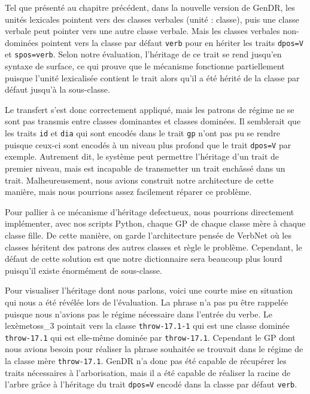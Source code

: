 Tel que présenté au chapitre précédent, dans la nouvelle version de GenDR, les unités lexicales pointent vers des classes verbales (unité : classe), puis une classe verbale peut pointer vers une autre classe verbale. Mais les classes verbales non-dominées pointent vers la classe par défaut \texttt{verb} pour en hériter les traits \texttt{dpos=V} et \texttt{spos=verb}. Selon notre évaluation, l'héritage de ce trait se rend jusqu'en syntaxe de surface, ce qui prouve que le mécanisme fonctionne partiellement puisque l'unité lexicalisée contient le trait alors qu'il a été hérité de la classe par défaut jusqu'à la sous-classe. 

Le transfert s'est donc correctement appliqué, mais les patrons de régime ne se sont pas transmis entre classes dominantes et classes dominées. Il semblerait que les traits \texttt{id} et \texttt{dia} qui sont encodés dans le trait \texttt{gp} n'ont pas pu se rendre puisque ceux-ci sont encodés à un niveau plus profond que le trait \texttt{dpos=V} par exemple. Autrement dit, le système peut permettre l'héritage d'un trait de premier niveau, mais est incapable de transmetter un trait enchâssé dans un trait. Malheureusement, nous avions construit notre architecture de cette manière, mais nous pourrions assez facilement réparer ce problème. 

Pour pallier à ce mécanisme d'héritage defectueux, nous pourrions directement implémenter, avec nos scripts Python, chaque \ac{GP} de chaque classe mère à chaque classe fille. De cette manière, on garde l'architecture pensée de VerbNet où les classes héritent des patrons des autres classes et règle le problème. Cependant, le défaut de cette solution est que notre dictionnaire sera beaucoup plus lourd puisqu'il existe énormément de sous-classe.

Pour visualiser l'héritage dont nous parlons, voici une courte mise en situation qui nous a été révélée lors de l'évaluation. La phrase  n'a pas pu être rappelée puisque nous n'avions pas le régime nécessaire dans l'entrée du verbe. Le lexème{toss\_3} pointait vers la classe \texttt{throw-17.1-1} qui est une classe dominée \texttt{throw-17.1} qui est elle-même dominée par \texttt{throw-17.1}. Cependant le \ac{GP} dont nous avions besoin pour réaliser la phrase souhaitée se trouvait dans le régime de la classe mère \texttt{throw-17.1}. GenDR n'a donc pas été capable de récupérer les traits nécessaires à l'arborisation, mais il a été capable de réaliser la racine de l'arbre grâce à l'héritage du trait \texttt{dpos=V} encodé dans la classe par défaut \texttt{verb}.

